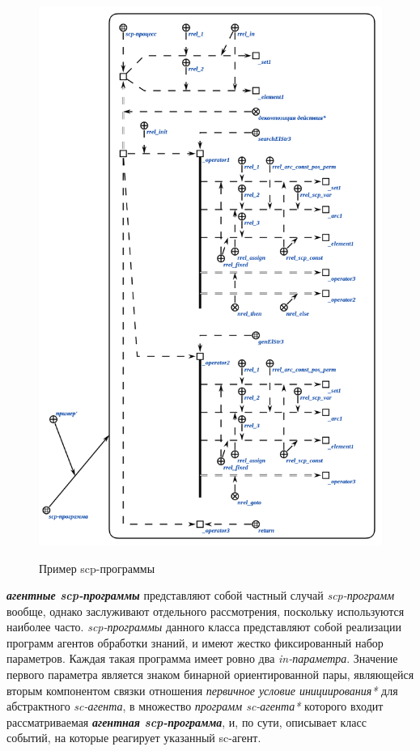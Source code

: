\begin{figure}[H]
	\centering
	\caption{Пример scp-программы}
	\includegraphics[scale=0.8]{images/part3/chapter_situation_management/program_example.png}
	\label{fig:program_example}
\end{figure}

\textbf{\textit{агентные scp-программы}} представляют собой частный случай \textit{scp-программ} вообще, однако заслуживают отдельного рассмотрения, поскольку используются наиболее часто. \textit{scp-программы} данного класса представляют собой реализации программ агентов обработки знаний, и имеют жестко фиксированный набор параметров. Каждая такая программа имеет ровно два \textit{in-параметра\scnrolesign}. Значение первого параметра является знаком бинарной ориентированной пары, являющейся вторым компонентом связки отношения \textit{первичное условие инициирования*} для абстрактного \textit{sc-агента}, в множество \textit{программ sc-агента*} которого входит рассматриваемая \textbf{\textit{агентная scp-программа}}, и, по сути, описывает класс событий, на которые реагирует указанный sc-агент.
	
